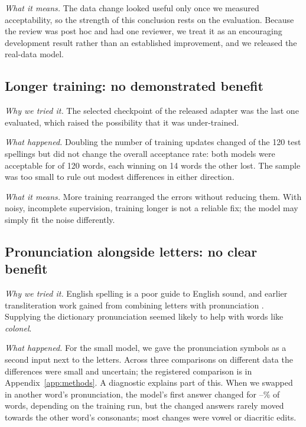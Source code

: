 \documentclass[10pt,a4paper,twocolumn]{article}
\begin{document}
\emph{What it means.} The data change looked useful only once we measured acceptability, so the strength of this
conclusion rests on the evaluation. Because the review was post hoc and had one reviewer, we treat it as an
encouraging development result rather than an established improvement, and we released the real-data model.

\subsection{Longer training: no demonstrated benefit}
\emph{Why we tried it.} The selected checkpoint of the released adapter was the last one evaluated, which raised the
possibility that it was under-trained.

\emph{What happened.} Doubling the number of training updates changed  of the 120 test spellings
but did not change the overall acceptance rate: both models were acceptable for  of 120
words, each winning on 14 words the other lost. The sample was too small to rule out modest differences in either
direction.

\emph{What it means.} More training rearranged the errors without reducing them. With noisy, incomplete
supervision, training longer is not a reliable fix; the model may simply fit the noise differently.

\subsection{Pronunciation alongside letters: no clear benefit}
\label{sec:res-pron}
\emph{Why we tried it.} English spelling is a poor guide to English sound, and earlier transliteration work gained
from combining letters with pronunciation \citep{oh-choi-2005-ensemble,ngo-etal-2015-phonology}. Supplying the
dictionary pronunciation seemed likely to help with words like \emph{colonel}.

\emph{What happened.} For the small model, we gave the pronunciation symbols as a second input next to the letters.
Across three comparisons on different data the differences were small and uncertain; the registered comparison is
in Appendix~\ref{app:methods}. A diagnostic explains part of this. When we swapped in another word's pronunciation,
the model's first answer changed for --\% of words, depending on the training run, but
the changed answers rarely moved towards the other word's consonants; most changes were vowel or diacritic edits.
\end{document}
